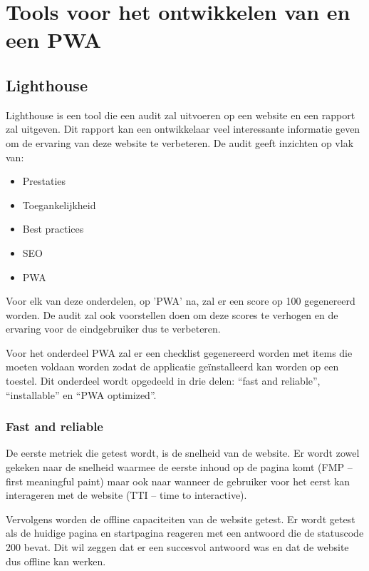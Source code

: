 \clearpage
\section{Tools voor het ontwikkelen van en een PWA}


\subsection{Lighthouse}

	Lighthouse is een tool die een audit zal uitvoeren op een website en een rapport zal uitgeven. Dit rapport kan een ontwikkelaar veel interessante informatie geven om de ervaring van deze website te verbeteren. De audit geeft inzichten op vlak van:
	
	\begin{itemize}
		\item	Prestaties
		\item	Toegankelijkheid
		\item	Best practices
		\item	SEO
		\item   PWA
	\end{itemize}
	
	\autocite{Lighthouse2020}
	
	Voor elk van deze onderdelen, op 'PWA' na, zal er een score op 100 gegenereerd worden. De audit zal ook voorstellen doen om deze scores te verhogen en de ervaring voor de eindgebruiker dus te verbeteren.
	
	Voor het onderdeel PWA zal er een checklist gegenereerd worden met items die moeten voldaan worden zodat de applicatie geïnstalleerd kan worden op een toestel. Dit onderdeel wordt opgedeeld in drie delen: “fast and reliable”, “installable” en “PWA optimized”.
	
	
	\subsubsection{Fast and reliable}
		De eerste metriek die getest wordt, is de snelheid van de website. Er wordt zowel gekeken naar de snelheid waarmee de eerste inhoud op de pagina komt (FMP – first meaningful paint) maar ook naar wanneer de gebruiker voor het eerst kan interageren met de website (TTI – time to interactive).
		\autocite{web.dev2020}
		
		Vervolgens worden de offline capaciteiten van de website getest. Er wordt getest als de huidige pagina en startpagina reageren met een antwoord die de statuscode 200 bevat. Dit wil zeggen dat er een succesvol antwoord was en dat de website dus offline kan werken.
	
